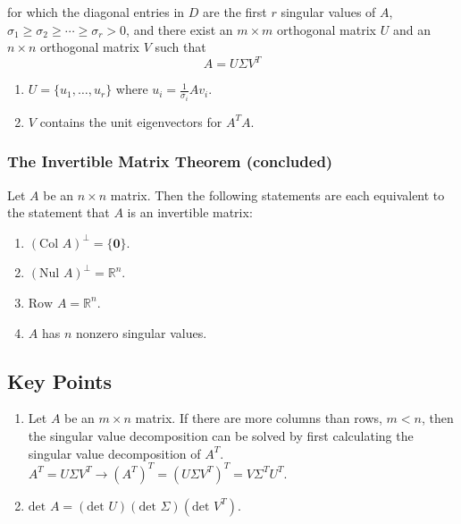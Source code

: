 \documentclass{article}
\begin{document}
for which the diagonal entries in $D$ are the first $r$ singular values of $A$,
$\sigma_1 \geq \sigma_2 \geq \cdots \geq \sigma_r > 0$, and there exist an $m\times m$ orthogonal
matrix $U$ and an $n\times n$ orthogonal matrix $V$ such that
\[A=U\Sigma V^T\]
\begin{enumerate}
    \item $U=\{u_1, \ldots, u_r\}$ where $u_i=\frac{1}{\sigma_i}Av_i$.
    \item $V$ contains the unit eigenvectors for $A^T A$.
\end{enumerate}

\subsubsection*{The Invertible Matrix Theorem (concluded)}
Let $A$ be an $n\times n$ matrix. Then the following statements are each equivalent to the
statement that $A$ is an invertible matrix:

\begin{enumerate}
    \item ${(\text{Col }A)}^\perp = \{\mathbf{0}\}$.
    \item ${(\text{Nul }A)}^\perp = \mathbb{R}^n$.
    \item $\text{Row }A=\mathbb{R}^n$.
    \item $A$ has $n$ nonzero singular values.
\end{enumerate}

\subsection*{Key Points}
\begin{enumerate}
    \item Let $A$ be an $m\times n$ matrix. If there are more columns than rows, $m<n$, then the
    singular value decomposition can be solved by first calculating the singular value
    decomposition of $A^T$. $A^T=U\Sigma V^T\rightarrow {(A^T)}^T={(U\Sigma V^T)}^T=V\Sigma^T U^T$.
    \item $\text{det }A=(\text{det }U)(\text{det }\Sigma)(\text{det }V^T)$.
\end{enumerate}
\end{document}
